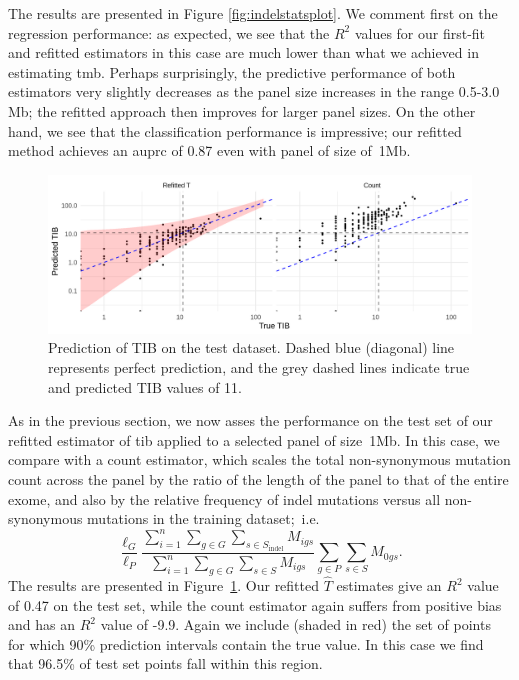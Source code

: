 \documentclass[12pt]{article}
\begin{document}
The results are presented in Figure \ref{fig:indelstatsplot}. We comment first on the regression performance: as expected, we see that the $R^2$ values for our first-fit and refitted estimators in this case are much lower than what we achieved in estimating \acrshort{tmb}. Perhaps surprisingly, the predictive performance of both estimators very slightly decreases as the panel size increases in the range 0.5-3.0 Mb; the refitted approach then improves for larger panel sizes. On the other hand, we see that the classification performance is impressive; our refitted method achieves an \acrshort{auprc} of 0.87 even with panel of size of~1Mb. 

\begin{figure}[htbp]
\centering
\includegraphics[width=6in]{indel_predictions_figure.png}
\vspace*{-5mm}
\caption{Prediction of TIB on the test dataset. Dashed blue (diagonal) line represents perfect prediction, and the grey dashed lines indicate true and predicted TIB values of 11. %
\label{fig:indel_predictions_figure}}
\vspace*{-2mm}
\end{figure} 

As in the previous section, we now asses the performance on the test set of our refitted estimator of \acrshort{tib} applied to a selected panel of size~1Mb.   %
In this case, we compare with a count estimator, which scales the total non-synonymous mutation count across the panel by the ratio of the length of the panel to that of the entire exome, and also by the relative frequency of indel mutations versus all non-synonymous mutations in the training dataset;~i.e. 
\[
\frac{\ell_G}{\ell_{P}} \frac{\sum_{i =1}^{n} \sum_{g \in G} \sum_{s \in S_{\text{indel}}} M_{igs}}{\sum_{i=1}^{n}\sum_{g \in G} \sum_{s \in S} M_{igs}}\sum_{g \in P} \sum_{s \in S} M_{0gs}.
\]
The results are presented in Figure~\ref{fig:indel_predictions_figure}. Our refitted $\hat{T}$ estimates give an $R^2$ value of 0.47 on the test set, while the count estimator again suffers from positive bias and has an $R^2$ value of -9.9. Again we include (shaded in red) the set of points for which 90\% prediction intervals contain the true value. In this case we find that 96.5\% of test set points fall within this region.
\end{document}
